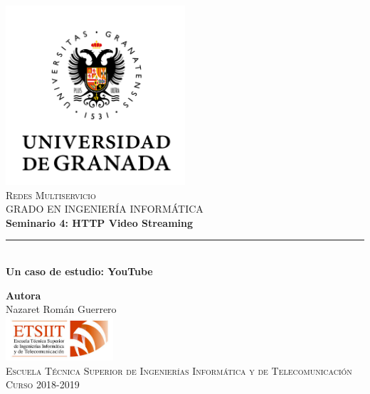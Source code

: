 \documentclass[11pt,a4paper]{article}
\begin{document}
\begin{titlepage}

\begin{minipage}{\textwidth}

\centering
\includegraphics[width=0.5\textwidth]{img/logo.png}\\

\textsc{\Large Redes Multiservicio\\[0.2cm]}
\textsc{GRADO EN INGENIERÍA INFORMÁTICA}\\[1cm]

{\Huge\bfseries Seminario 4: HTTP Video Streaming\\}
\noindent\rule[-1ex]{\textwidth}{3pt}\\[3.5ex]
{\large\bfseries Un caso de estudio: YouTube}
\end{minipage}

\vspace{1.5cm}
\begin{minipage}{\textwidth}
\centering

\textbf{Autora}\\ {Nazaret Román Guerrero}\\[2.5ex]
\includegraphics[width=0.3\textwidth]{img/etsiit.jpeg}\\[0.1cm]
\vspace{1cm}
\textsc{Escuela Técnica Superior de Ingenierías Informática y de Telecomunicación}\\
\vspace{1cm}
\textsc{Curso 2018-2019}
\end{minipage}
\end{titlepage}

\tableofcontents
\thispagestyle{empty}
\end{document}
